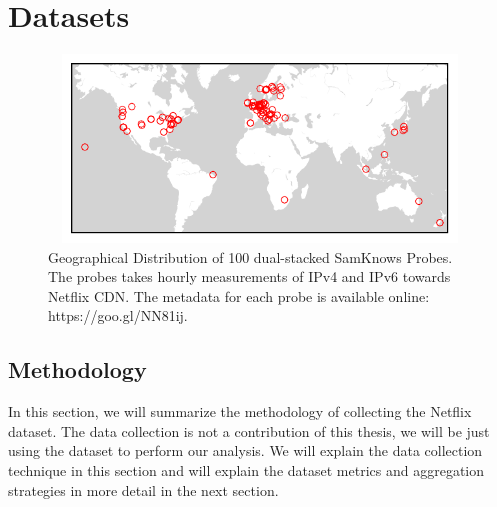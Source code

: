 \chapter{Datasets}\label{chapter:Datasets}

\begin{figure}[!ht]
	\centering
	\includegraphics[keepaspectratio, height = 5cm, width=15cm]{figures/probes-geo-distribution.pdf}
	\caption[Probes Geographical Distribution]{Geographical Distribution of 100 dual-stacked SamKnows Probes. The probes takes hourly measurements of IPv4 and IPv6 towards Netflix CDN. The metadata for each probe is available online: https://goo.gl/NN81ij.}
	\label{fig:PROBES GEO DISTRIBUTION}
\end{figure}

\section{Methodology}
In this section, we will summarize the methodology of collecting the Netflix dataset. 
The data collection is not a contribution of this thesis, we will be just using the dataset to perform our analysis. 
We will explain the data collection technique in this section and will explain the dataset metrics and aggregation strategies in more detail in the next section. 

